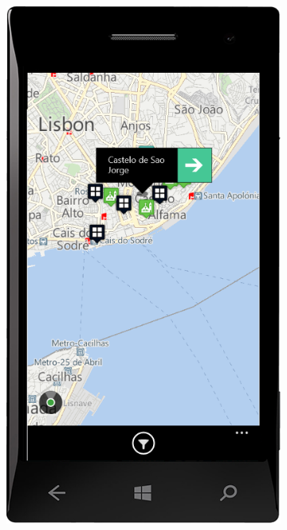 \documentclass{book}
\begin{document}
\begin{figure}[H]
\begin{subfigure}{0.3\textwidth}
						\includegraphics[width=\textwidth]{screenshots/mobile/mobile10.png}
						\caption{\label{subfig:mobile_marker}}		
					\end{subfigure}
					\hfill
					\begin{subfigure}{0.3\textwidth}

\end{subfigure}
\end{figure}
\end{document}

